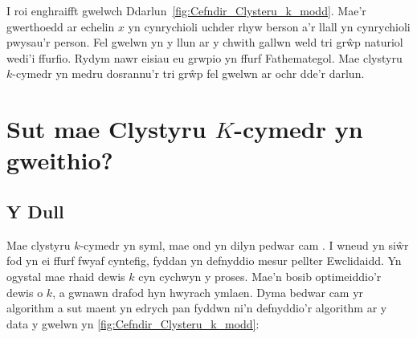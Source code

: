 I roi enghraifft gwelwch Ddarlun~\ref{fig:Cefndir_Clysteru_k_modd}. Mae'r gwerthoedd ar echelin $x$ yn cynrychioli uchder rhyw berson a'r llall yn cynrychioli pwysau'r person. Fel gwelwn yn y llun ar y chwith gallwn weld tri gr\^{w}p naturiol wedi'i ffurfio. Rydym nawr eisiau eu grwpio yn ffurf Fathemategol. Mae clystyru $k$-cymedr yn medru dosrannu'r tri gr\^{w}p fel gwelwn ar ochr dde'r darlun. 


\section{Sut mae Clystyru $K$-cymedr yn gweithio?}

\subsection{Y Dull}

Mae clystyru $k$-cymedr yn syml, mae ond yn dilyn pedwar cam \cite{K-means-clustering}. I wneud yn si\^{w}r fod yn ei ffurf fwyaf cyntefig, fyddan yn defnyddio mesur pellter Ewclidaidd. Yn ogystal mae rhaid dewis $k$ cyn cychwyn y proses. Mae'n bosib optimeiddio'r dewis o $k$, a gwnawn drafod hyn hwyrach ymlaen. Dyma bedwar cam yr algorithm a sut maent yn edrych pan fyddwn ni'n defnyddio'r algorithm ar y data y gwelwn yn \ref{fig:Cefndir_Clysteru_k_modd}:

